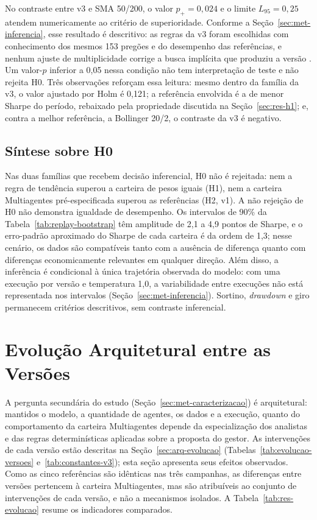 \documentclass{eic-bcc-tcc}
\begin{document}
No contraste entre v3 e SMA 50/200, o valor $p_{+} = 0{,}024$ e o limite $L_{95} = 0{,}25$ atendem numericamente ao critério de superioridade. Conforme a Seção~\ref{sec:met-inferencia}, esse resultado é descritivo: as regras da v3 foram escolhidas com conhecimento dos mesmos 153 pregões e do desempenho das referências, e nenhum ajuste de multiplicidade corrige a busca implícita que produziu a versão \citep{White2000, Bailey2017}. Um valor-$p$ inferior a 0,05 nessa condição não tem interpretação de teste e não rejeita H0. Três observações reforçam essa leitura: mesmo dentro da família da v3, o valor ajustado por Holm é 0,121; a referência envolvida é a de menor Sharpe do período, rebaixado pela propriedade discutida na Seção~\ref{sec:res-h1}; e, contra a melhor referência, a Bollinger 20/2, o contraste da v3 é negativo.

\subsection{Síntese sobre H0}
\label{sec:res-h0}

Nas duas famílias que recebem decisão inferencial, H0 não é rejeitada: nem a regra de tendência superou a carteira de pesos iguais (H1), nem a carteira Multiagentes pré-especificada superou as referências (H2, v1). A não rejeição de H0 não demonstra igualdade de desempenho. Os intervalos de 90\% da Tabela~\ref{tab:replay-bootstrap} têm amplitude de 2,1 a 4,9 pontos de Sharpe, e o erro-padrão aproximado do Sharpe de cada carteira é da ordem de 1,3; nesse cenário, os dados são compatíveis tanto com a ausência de diferença quanto com diferenças economicamente relevantes em qualquer direção. Além disso, a inferência é condicional à única trajetória observada do modelo: com uma execução por versão e temperatura 1,0, a variabilidade entre execuções não está representada nos intervalos (Seção~\ref{sec:met-inferencia}). Sortino, \textit{drawdown} e giro permanecem critérios descritivos, sem contraste inferencial.

\section{Evolução Arquitetural entre as Versões}
\label{sec:res-evolucao}

A pergunta secundária do estudo (Seção~\ref{sec:met-caracterizacao}) é arquitetural: mantidos o modelo, a quantidade de agentes, os dados e a execução, quanto do comportamento da carteira Multiagentes depende da especialização dos analistas e das regras determinísticas aplicadas sobre a proposta do gestor. As intervenções de cada versão estão descritas na Seção~\ref{sec:arq-evolucao} (Tabelas~\ref{tab:evolucao-versoes} e~\ref{tab:constantes-v3}); esta seção apresenta seus efeitos observados. Como as cinco referências são idênticas nas três campanhas, as diferenças entre versões pertencem à carteira Multiagentes, mas são atribuíveis ao conjunto de intervenções de cada versão, e não a mecanismos isolados. A Tabela~\ref{tab:res-evolucao} resume os indicadores comparados.
\end{document}
